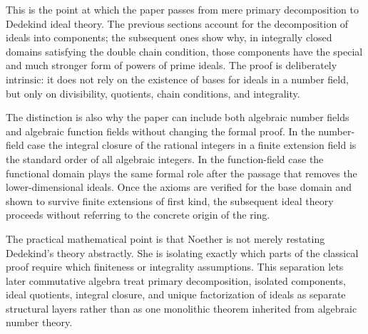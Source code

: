 \documentclass[11pt]{article}
\begin{document}
This is the point at which the paper passes from mere primary decomposition to Dedekind ideal theory. The previous sections account for the decomposition of ideals into components; the subsequent ones show why, in integrally closed domains satisfying the double chain condition, those components have the special and much stronger form of powers of prime ideals. The proof is deliberately intrinsic: it does not rely on the existence of bases for ideals in a number field, but only on divisibility, quotients, chain conditions, and integrality.

The distinction is also why the paper can include both algebraic number fields and algebraic function fields without changing the formal proof. In the number-field case the integral closure of the rational integers in a finite extension field is the standard order of all algebraic integers. In the function-field case the functional domain plays the same formal role after the passage that removes the lower-dimensional ideals. Once the axioms are verified for the base domain and shown to survive finite extensions of first kind, the subsequent ideal theory proceeds without referring to the concrete origin of the ring.

The practical mathematical point is that Noether is not merely restating Dedekind's theory abstractly. She is isolating exactly which parts of the classical proof require which finiteness or integrality assumptions. This separation lets later commutative algebra treat primary decomposition, isolated components, ideal quotients, integral closure, and unique factorization of ideals as separate structural layers rather than as one monolithic theorem inherited from algebraic number theory.
\end{document}
